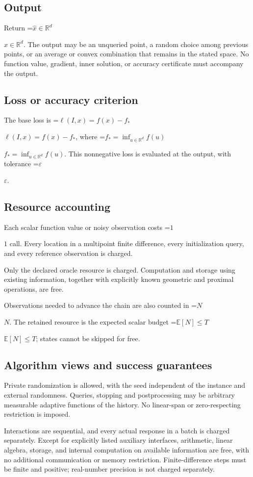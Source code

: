 \documentclass[10pt,a4paper]{article}
\newcommand{\AtlasMath}[1]{\par\begingroup\centering\setbox0=\hbox{$\displaystyle #1$}\ifdim\wd0>1.4\linewidth\typeout{ATLAS WIDE FORMULA: \the\wd0}\fi\ifdim\wd0>\linewidth\resizebox{\linewidth}{!}{\box0}\else\box0\fi\par\endgroup}
\newcommand{\AtlasInlineMath}[1]{\begingroup\setbox0=\hbox{$#1$}\ifdim\wd0>.4\linewidth\endgroup\AtlasMath{#1}\else\endgroup$#1$\fi}
\begin{document}
\subsection{Output}
Return \AtlasInlineMath{\widehat{x}\in \mathbb{R}^d}. The output may be an unqueried point, a random choice among previous points, or an average or convex combination that remains in the stated space. No function value, gradient, inner solution, or accuracy certificate must accompany the output.

\subsection{Loss or accuracy criterion}
The base loss is \AtlasInlineMath{\ell(I,x)=f(x)-f_*}, where \AtlasInlineMath{f_*=\inf_{u\in \mathbb{R}^d}f(u)}. This nonnegative loss is evaluated at the output, with tolerance \AtlasInlineMath{\varepsilon}.

\subsection{Resource accounting}
Each scalar function value or noisy observation costs \AtlasInlineMath{1} call. Every location in a multipoint finite difference, every initialization query, and every reference observation is charged.

Only the declared oracle resource is charged. Computation and storage using existing information, together with explicitly known geometric and proximal operations, are free.

Observations needed to advance the chain are also counted in \AtlasInlineMath{N}. The retained resource is the expected scalar budget \AtlasInlineMath{\mathbb{E}[N]\le T}; states cannot be skipped for free.

\subsection{Algorithm views and success guarantees}
Private randomization is allowed, with the seed independent of the instance and external randomness. Queries, stopping and postprocessing may be arbitrary measurable adaptive functions of the history. No linear-span or zero-respecting restriction is imposed.

Interactions are sequential, and every actual response in a batch is charged separately. Except for explicitly listed auxiliary interfaces, arithmetic, linear algebra, storage, and internal computation on available information are free, with no additional communication or memory restriction. Finite-difference steps must be finite and positive; real-number precision is not charged separately.
\end{document}
